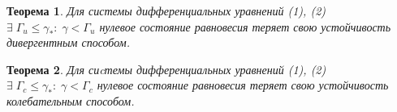 \documentclass[fullscreen=true, unicode, bookmarks=false]{beamer}
\newtheorem{rustheorem}{Теорема }
\begin{document}
\begin{frame}

\begin{rustheorem}
Для системы дифференциальных уравнений (1), (2) $\exists\;\Gamma_u\leqslant\gamma_*: \; \gamma<\Gamma_u$ нулевое состояние равновесия теряет свою устойчивость дивергентным способом.
\end{rustheorem}

\bigskip
\pause
\bigskip

\begin{rustheorem}
Для сиcтемы дифференциальных уравнений (1), (2) $\exists\;\Gamma_c\leqslant\gamma_*: \; \gamma<\Gamma_c$ нулевое состояние равновесия теряет свою устойчивость колебательным способом.
\end{rustheorem}

\end{frame}

\begin{frame}
\titlepage
\end{frame}
\end{document}
